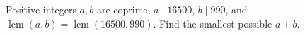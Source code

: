 Positive integers $a,b$ are coprime, $a\mid16500$, $b\mid990$, and $\operatorname{lcm}(a,b)=\operatorname{lcm}(16500,990)$. Find the smallest possible $a+b$.
